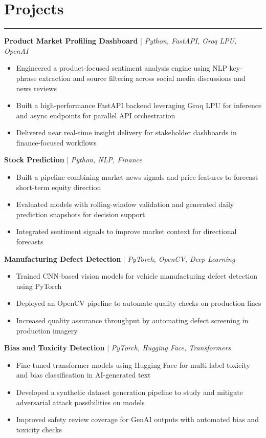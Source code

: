 \documentclass[9pt]{extarticle}
\begin{document}
\section{Projects}
\vspace{-6pt}\hrule\vspace{4pt}
\textbf{Product Market Profiling Dashboard} | \textit{Python, FastAPI, Groq LPU, OpenAI}
\begin{itemize}
    \item Engineered a product-focused sentiment analysis engine using NLP key-phrase extraction and source filtering across social media discussions and news reviews
    \item Built a high-performance FastAPI backend leveraging Groq LPU for inference and async endpoints for parallel API orchestration
    \item Delivered near real-time insight delivery for stakeholder dashboards in finance-focused workflows
\end{itemize}

\vspace{2pt}
\textbf{Stock Prediction} | \textit{Python, NLP, Finance}
\begin{itemize}
    \item Built a pipeline combining market news signals and price features to forecast short-term equity direction
    \item Evaluated models with rolling-window validation and generated daily prediction snapshots for decision support
    \item Integrated sentiment signals to improve market context for directional forecasts
\end{itemize}

\vspace{2pt}
\textbf{Manufacturing Defect Detection} | \textit{PyTorch, OpenCV, Deep Learning}
\begin{itemize}
    \item Trained CNN-based vision models for vehicle manufacturing defect detection using PyTorch
    \item Deployed an OpenCV pipeline to automate quality checks on production lines
    \item Increased quality assurance throughput by automating defect screening in production imagery
\end{itemize}

\vspace{2pt}
\textbf{Bias and Toxicity Detection} | \textit{PyTorch, Hugging Face, Transformers}
\begin{itemize}
    \item Fine-tuned transformer models using Hugging Face for multi-label toxicity and bias classification in AI-generated text
    \item Developed a synthetic dataset generation pipeline to study and mitigate adversarial attack possibilities on models
    \item Improved safety review coverage for GenAI outputs with automated bias and toxicity checks
\end{itemize}
\end{document}
